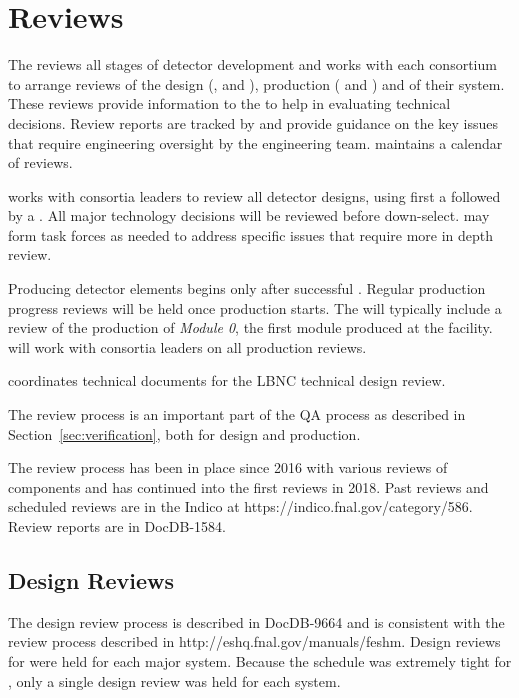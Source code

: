 \chapter{Reviews}
\label{vl:tc-review}

The  reviews all stages of detector development and works
with each consortium to arrange reviews of the design (,
 and ), production ( and
) and  of their system.  These reviews provide
information to the  to help in evaluating technical
decisions.  Review reports are tracked by  and provide
guidance on the key issues that require engineering oversight by the
 engineering team.  maintains a calendar of
 reviews.

 works with consortia leaders to review all detector designs,
using first a  followed by a .  All
major technology decisions will be reviewed before down-select.  
may form task forces as needed to address specific issues that require more
in depth review.


Producing detector elements begins only after
successful . Regular production progress
reviews will be held once production starts. The 
will typically include a review of the production of \textit{Module 0}, the
first module produced at the facility.  will work with
consortia leaders on all production reviews.

 coordinates technical documents for the LBNC
technical design review.

The review process is an important part of the  QA process
as described in Section~\ref{sec:verification}, both for
design and production.

The review process has been in place since 2016 with various reviews
of  components and has continued into the first 
reviews in 2018. Past reviews and scheduled reviews are in the
 Indico at https://indico.fnal.gov/category/586.
Review reports are in DocDB-1584.

\section{Design Reviews}

The  design review process is described in DocDB-9664
and is consistent with the \fnal review process described in
http://eshq.fnal.gov/manuals/feshm. Design reviews for  were held for each
major system. Because the schedule was extremely tight for , only a single design review
was held for each system.


